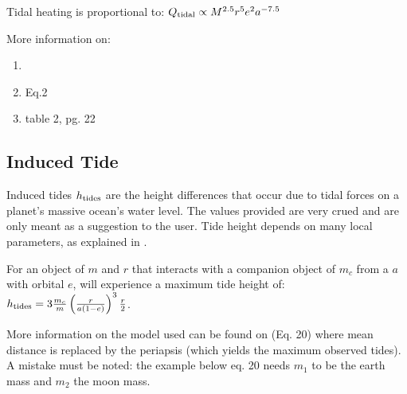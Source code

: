 \documentclass[letterpaper,10pt,english]{sphinxmanual}
\begin{document}
\sphinxAtStartPar
Tidal heating is proportional to: \(Q_{\rm tidal} \propto M^{2.5} r^5 e^2 a^{-7.5}\)

\sphinxAtStartPar
More information on:
\begin{enumerate}
%
\item {} 
\sphinxAtStartPar
{}

\item {} 
\sphinxAtStartPar
{} Eq.2

\item {} 
\sphinxAtStartPar
{} table 2, pg. 22

\end{enumerate}


\subsection{Induced Tide}
\label{\detokenize{quantities/surface/induced_tide:induced-tide}}\label{\detokenize{quantities/surface/induced_tide::doc}}
\sphinxAtStartPar
Induced tides \(h_{\rm tides}\) are the height differences that occur due to tidal forces
on a planet’s massive ocean’s water level. The values provided are very
crued and are only meant as a suggestion to the user. Tide height depends
on many local parameters, as explained in .

\sphinxAtStartPar
For an object of {\hyperref[\detokenize{quantities/material/mass:id1}]{}} \(m\) and {\hyperref[\detokenize{quantities/geometric/radius:id1}]{}} \(r\)
that interacts with a companion object of {\hyperref[\detokenize{quantities/material/mass:id1}]{}} \(m_c\)
from a {\hyperref[\detokenize{quantities/orbital/semi_major_axis:id1}]{}} \(a\)
with orbital {\hyperref[\detokenize{quantities/orbital/eccentricity:id1}]{}} \(e\),
will experience a maximum tide height of:
\(h_{\rm tides} = 3 \frac{m_c}{m} \left(\frac{r}{a (1 - e)}\right)^3 \frac{r}{2}\).

\sphinxAtStartPar
More information on the model used can be found on
 (Eq. 20)
where mean distance is replaced by the periapsis (which yields the maximum observed tides).
A mistake must be noted: the example below eq. 20 needs \(m_1\) to be the earth mass
and \(m_2\) the moon mass.
\end{document}
